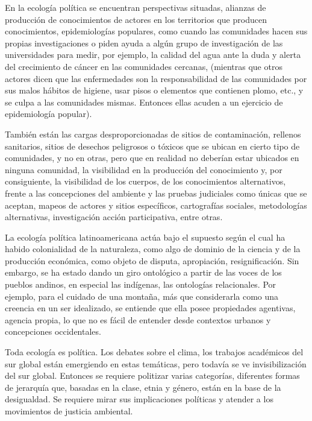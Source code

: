 \documentclass[
    a4paper,%
    DIV=calc,%
    abstract=true%
  ]{scrartcl}%
\begin{document}
  En la ecología política se encuentran perspectivas situadas, alianzas
  de producción de conocimientos de actores en los territorios que
  producen conocimientos, epidemiologías populares, como cuando las
  comunidades hacen sus propias investigaciones o piden ayuda a algún
  grupo de investigación de las universidades para medir, por ejemplo,
  la calidad del agua ante la duda y alerta del crecimiento de cáncer en
  las comunidades cercanas, (mientras que otros actores dicen que las
  enfermedades son la responsabilidad de las comunidades por sus malos
  hábitos de higiene, usar pisos o elementos que contienen plomo, etc.,
  y se culpa a las comunidades mismas. Entonces ellas acuden a un
  ejercicio de epidemiología popular).

  También están las cargas desproporcionadas de sitios de contaminación,
  rellenos sanitarios, sitios de desechos peligrosos o tóxicos que se
  ubican en cierto tipo de comunidades, y no en otras, pero que en
  realidad no deberían estar ubicados en ninguna comunidad, la
  visibilidad en la producción del conocimiento y, por consiguiente, la
  visibilidad de los cuerpos, de los conocimientos alternativos, frente
  a las concepciones del ambiente y las pruebas judiciales como únicas
  que se aceptan, mapeos de actores y sitios específicos, cartografías
  sociales, metodologías alternativas, investigación acción
  participativa, entre otras.

  La ecología política latinoamericana actúa bajo el supuesto según el
  cual ha habido colonialidad de la naturaleza, como algo de dominio de
  la ciencia y de la producción económica, como objeto de disputa,
  apropiación, resignificación. Sin embargo, se ha estado dando un giro
  ontológico a partir de las voces de los pueblos andinos, en especial
  las indígenas, las ontologías relacionales. Por ejemplo, para el
  cuidado de una montaña, más que considerarla como una creencia en un
  ser idealizado, se entiende que ella posee propiedades agentivas,
  agencia propia, lo que no es fácil de entender desde contextos urbanos
  y concepciones occidentales.

  Toda ecología es política. Los debates sobre el clima, los trabajos
  académicos del sur global están emergiendo en estas temáticas, pero
  todavía se ve invisibilización del sur global. Entonces se requiere
  politizar varias categorías, diferentes formas de jerarquía que,
  basadas en la clase, etnia y género, están en la base de la
  desigualdad. Se requiere mirar sus implicaciones políticas y atender a
  los movimientos de justicia ambiental.
\end{document}
